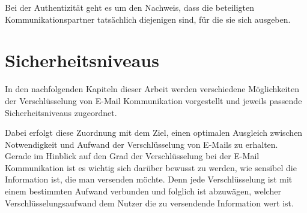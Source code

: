\documentclass  [paper=a4,
				fontsize=12pt,
				listof=totoc,
				bibliography=totoc
				]{scrreprt}
\begin{document}
	Bei der Authentizität geht es um den Nachweis, dass die beteiligten Kommunikationspartner tatsächlich diejenigen sind, für die sie sich ausgeben.
	
	\chapter{Sicherheitsniveaus}
	
	
		In den nachfolgenden Kapiteln dieser Arbeit werden verschiedene Möglichkeiten der Verschlüsselung von E-Mail Kommunikation vorgestellt und jeweils passende Sicherheitsniveaus zugeordnet. %
		
		Dabei erfolgt diese Zuordnung mit dem Ziel, einen optimalen Ausgleich zwischen Notwendigkeit und Aufwand der Verschlüsselung von E-Mails zu erhalten.
		\medskip\\
		
	
	
		
		Gerade im Hinblick auf den Grad der Verschlüsselung bei der E-Mail Kommunikation ist es wichtig sich darüber bewusst zu werden, wie sensibel die Information ist, die man versenden möchte. Denn jede Verschlüsselung ist mit einem bestimmten Aufwand verbunden und folglich ist abzuwägen, welcher Verschlüsselungsaufwand dem Nutzer die zu versendende Information wert ist. 
		\medskip\\
		
	
\end{document}
